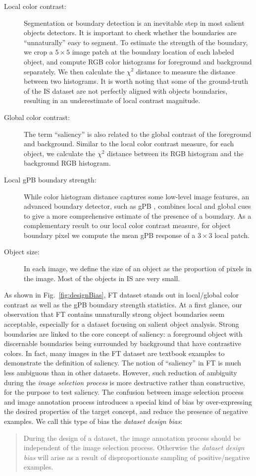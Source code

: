 \begin{description}
\item [Local color contrast:] Segmentation or boundary detection is an inevitable step in most salient objects detectors.  It is important to check whether the boundaries are ``unnaturally'' easy to segment.  To estimate the strength of the boundary, we crop a $5 \times 5$ image patch at the boundary location of each labeled object, and compute RGB color histograms for foreground and background separately.  We then calculate the $\chi^2$ distance to measure the distance between two histograms.  It is worth noting that some of the ground-truth of the IS dataset are not perfectly aligned with objects boundaries, resulting in an underestimate of local contrast magnitude.
\item [Global color contrast:] The term ``saliency'' is also related to the global contrast of the foreground and background.  Similar to the local color contrast measure, for each object, we calculate the $\chi^2$ distance between its RGB histogram and the background RGB histogram.
\item [Local gPB boundary strength:] While color histogram distance captures some low-level image features, an advanced boundary detector, such as gPB \cite{arbelaez2011contour}, combines local and global cues to give a more comprehensive estimate of the presence of a boundary.  As a complementary result to our local color contrast measure, for object boundary pixel we compute the mean gPB response of a $3 \times 3$ local patch.
\item [Object size:] In each image, we define the size of an object as the proportion of pixels in the image.  Most of the objects in IS are very small.
\end{description}


As shown in Fig.~\ref{fig:designBias}, FT dataset stands out in local/global color contrast as well as the gPB boundary strength statistics.  At a first glance, our observation that FT contains unnaturally strong object boundaries seem acceptable, especially for a dataset focusing on salient object analysis.  Strong boundaries are linked to the core concept of saliency: a foreground object with discernable boundaries being surrounded by background that have contrastive colors.  In fact, many images in the FT dataset are textbook examples to demonstrate the definition of saliency.  The notion of ``saliency'' in FT is much less ambiguous than in other datasets.  However, such reduction of ambiguity during the \emph{image selection process} is more destructive rather than constructive, for the purpose to test saliency.  The confusion between image selection process and image annotation process introduces a special kind of bias by over-expressing the desired properties of the target concept, and reduce the presence of negative examples.  We call this type of bias the \emph{dataset design bias}:
\begin{quote}
During the design of a dataset, the image annotation process should be independent of the image selection process.  Otherwise the \emph{dataset design bias} will arise as a result of disproportionate sampling of positive/negative examples.
\end{quote}



